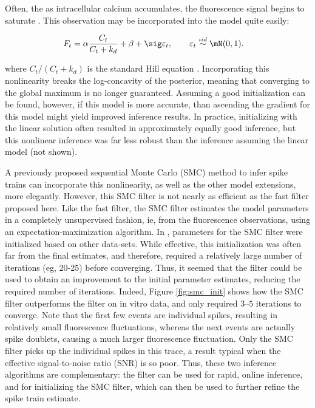 Often, the as intracellular calcium accumulates, the fluorescence signal begins to saturate \cite{PologrutoSvoboda04}.  This observation may be incorporated into the model quite easily:

\begin{align}
	F_t &= \alpha \frac{C_t}{C_t+k_d} + \beta +  \sig \varepsilon_t, \qquad \varepsilon_t \overset{iid}{\sim} \mN(0,1).
\end{align}

\noindent where $C_t/(C_t+k_d)$ is the standard Hill equation \cite{PologrutoSvoboda04}.  Incorporating this nonlinearity breaks the log-concavity of the posterior, meaning that converging to the global maximum is no longer guaranteed.  Assuming a good initialization can be found, however, if this model is more accurate, than ascending the gradient for this model might yield improved inference results.  In practice, initializing with the linear solution often resulted in approximately equally good inference, but this nonlinear inference was far less robust than the inference assuming the linear model (not shown).  

A previously proposed sequential Monte Carlo (SMC) method to infer spike trains \cite{VogelsteinPaninski09} can incorporate this nonlinearity, as well as the other model extensions, more elegantly. However, this SMC filter is not nearly as efficient as the fast filter proposed here.  Like the fast filter, the SMC filter estimates the model parameters in a completely unsupervised fashion, ie, from the fluorescence observations, using an expectation-maximization algorithm.  In \cite{VogelsteinPaninski09}, parameters for the SMC filter were initialized based on other data-sets.  While effective, this initialization was often far from the final estimates, and therefore, required a relatively large number of iterations (eg, 20-25) before converging.  Thus, it seemed that the \foopsi filter could be used to obtain an improvement to the initial parameter estimates, reducing the required number of iterations.  Indeed, Figure \ref{fig:smc_init} shows how the SMC filter outperforms the \foopsi filter on in vitro data, and only required $3$--$5$ iterations to converge.  Note that the first few events are individual spikes, resulting in relatively small fluorescence fluctuations, whereas the next events are actually spike doublets, causing a much larger fluorescence fluctuation.  Only the SMC filter picks up the individual spikes in this trace, a result typical when the effective signal-to-noise ratio (SNR) is so poor.  Thus, these two inference algorithms are complementary: the \foopsi filter can be used for rapid, online inference, and for initializing the SMC filter, which can then be used to further refine the spike train estimate.

